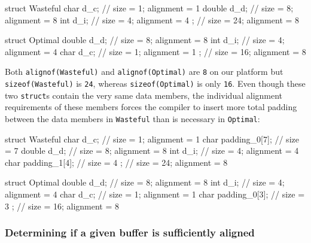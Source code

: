 \begin{emcppslisting}
struct Wasteful
{
    char   d_c;  // size =  1;  alignment = 1
    double d_d;  // size =  8;  alignment = 8
    int    d_i;  // size =  4;  alignment = 4
};               // size = 24;  alignment = 8

struct Optimal
{
    double d_d;  // size =  8;  alignment = 8
    int    d_i;  // size =  4;  alignment = 4
    char   d_c;  // size =  1;  alignment = 1
};               // size = 16;  alignment = 8
\end{emcppslisting}
    
\noindent Both \lstinline!alignof(Wasteful)! and \lstinline!alignof(Optimal)! are
\lstinline!8! on our platform but \lstinline!sizeof(Wasteful)! is \lstinline!24!, whereas
\lstinline!sizeof(Optimal)! is only \lstinline!16!. Even though these two
\lstinline!struct!s contain the very same data members, the individual
alignment requirements of these members forces the compiler to insert
more total padding between the data members in \lstinline!Wasteful! than is
necessary in \lstinline!Optimal!:

\begin{emcppslisting}
struct Wasteful
{
    char   d_c;           // size =  1;  alignment = 1
    char   padding_0[7];  // size =  7
    double d_d;           // size =  8;  alignment = 8
    int    d_i;           // size =  4;  alignment = 4
    char   padding_1[4];  // size =  4
};                        // size = 24;  alignment = 8

struct Optimal
{
    double d_d;           // size =  8;  alignment = 8
    int    d_i;           // size =  4;  alignment = 4
    char   d_c;           // size =  1;  alignment = 1
    char   padding_0[3];  // size =  3
};                        // size = 16;  alignment = 8
\end{emcppslisting}
    

\subsubsection[Determining if a given buffer is sufficiently aligned]{Determining if a given buffer is sufficiently aligned}\label{determining-if-a-given-buffer-is-sufficiently-aligned}

